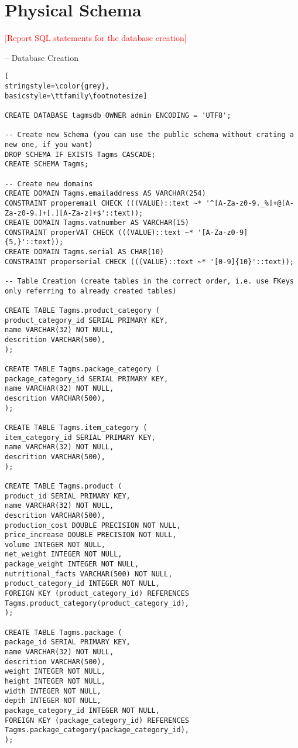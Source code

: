 \section{Physical Schema}
\textcolor{red}{[Report SQL statements for the database creation]}

-- Database Creation
\begin{lstlisting}[
stringstyle=\color{grey},
basicstyle=\ttfamily\footnotesize]

CREATE DATABASE tagmsdb OWNER admin ENCODING = 'UTF8';

-- Create new Schema (you can use the public schema without crating a new one, if you want)
DROP SCHEMA IF EXISTS Tagms CASCADE;
CREATE SCHEMA Tagms;

-- Create new domains
CREATE DOMAIN Tagms.emailaddress AS VARCHAR(254)
CONSTRAINT properemail CHECK (((VALUE)::text ~* '^[A-Za-z0-9._%]+@[A-Za-z0-9.]+[.][A-Za-z]+$'::text));
CREATE DOMAIN Tagms.vatnumber AS VARCHAR(15)
CONSTRAINT properVAT CHECK (((VALUE)::text ~* '[A-Za-z0-9]{5,}'::text));
CREATE DOMAIN Tagms.serial AS CHAR(10)
CONSTRAINT properserial CHECK (((VALUE)::text ~* '[0-9]{10}'::text));

-- Table Creation (create tables in the correct order, i.e. use FKeys only referring to already created tables)

CREATE TABLE Tagms.product_category (
product_category_id SERIAL PRIMARY KEY,
name VARCHAR(32) NOT NULL,
descrition VARCHAR(500),
);

CREATE TABLE Tagms.package_category (
package_category_id SERIAL PRIMARY KEY,
name VARCHAR(32) NOT NULL,
descrition VARCHAR(500),
);

CREATE TABLE Tagms.item_category (
item_category_id SERIAL PRIMARY KEY,
name VARCHAR(32) NOT NULL,
descrition VARCHAR(500),
);

CREATE TABLE Tagms.product (
product_id SERIAL PRIMARY KEY,
name VARCHAR(32) NOT NULL,
descrition VARCHAR(500),
production_cost DOUBLE PRECISION NOT NULL,
price_increase DOUBLE PRECISION NOT NULL,
volume INTEGER NOT NULL,
net_weight INTEGER NOT NULL,
package_weight INTEGER NOT NULL,
nutritional_facts VARCHAR(500) NOT NULL,
product_category_id INTEGER NOT NULL,
FOREIGN KEY (product_category_id) REFERENCES Tagms.product_category(product_category_id),
);

CREATE TABLE Tagms.package (
package_id SERIAL PRIMARY KEY,
name VARCHAR(32) NOT NULL,
descrition VARCHAR(500),
weight INTEGER NOT NULL,
height INTEGER NOT NULL,
width INTEGER NOT NULL,
depth INTEGER NOT NULL,
package_category_id INTEGER NOT NULL,
FOREIGN KEY (package_category_id) REFERENCES Tagms.package_category(package_category_id),
);


\end{lstlisting}
